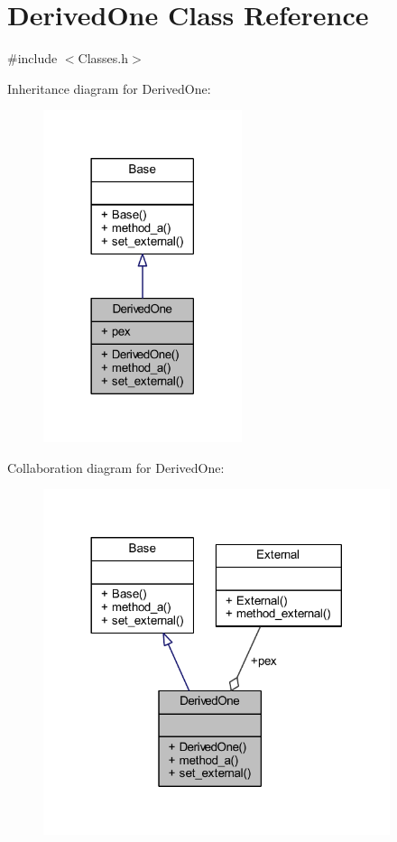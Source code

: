 \hypertarget{class_derived_one}{}\section{Derived\+One Class Reference}
\label{class_derived_one}


{\ttfamily \#include $<$Classes.\+h$>$}



Inheritance diagram for Derived\+One\+:
\nopagebreak
\begin{figure}[H]
\begin{center}
\leavevmode
\includegraphics[width=165pt]{class_derived_one__inherit__graph}
\end{center}
\end{figure}


Collaboration diagram for Derived\+One\+:
\nopagebreak
\begin{figure}[H]
\begin{center}
\leavevmode
\includegraphics[width=288pt]{class_derived_one__coll__graph}
\end{center}
\end{figure}

